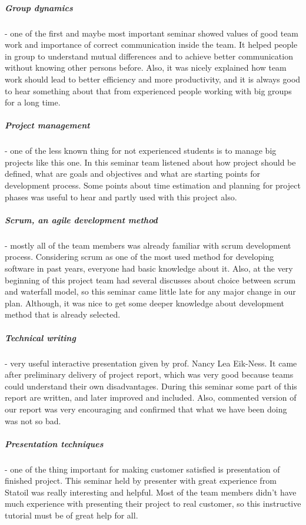 	\subparagraph{Group dynamics} - one of the first and maybe most important seminar showed values of good team work and importance of correct communication inside the team. It helped people in group to understand mutual differences and to achieve better communication without knowing other persons before. Also, it was nicely explained how team work should lead to better efficiency and more productivity, and it is always good to hear something about that from experienced people working with big groups for a long time.
	\subparagraph{Project management} - one of the less known thing for not experienced students is to manage big projects like this one. In this seminar team listened about how project should be defined, what are goals and objectives and what are starting points for development process. Some points about time estimation and planning for project phases was useful to hear and partly used with this project also.
	\subparagraph{Scrum, an agile development method} - mostly all of the team members was already familiar with scrum development process. Considering scrum as one of the most used method for developing software in past years, everyone had basic knowledge about it. Also, at the very beginning of this project team had several discusses about choice between scrum and waterfall model, so this seminar came little late for any major change in our plan. Although, it was nice to get some deeper knowledge about development method that is already selected.
	\subparagraph{Technical writing} - very useful interactive presentation given by prof. Nancy Lea Eik-Ness. It came after preliminary delivery of project report, which was very good because teams could understand their own disadvantages. During this seminar some part of this report are written, and later improved and included. Also, commented version of our report was very encouraging and confirmed that what we have been doing was not so bad.
	\subparagraph{Presentation techniques} - one of the thing important for making customer satisfied is presentation of finished project. This seminar held by presenter with great experience from Statoil was really interesting and helpful. Most of the team members didn't have much experience with presenting their project to real customer, so this instructive tutorial must be of great help for all.


